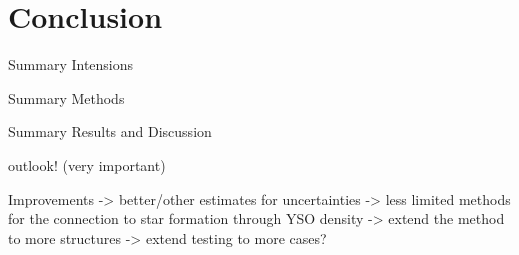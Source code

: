 \chapter{Conclusion}

Summary Intensions

Summary Methods

Summary Results and Discussion

outlook! (very important) 

Improvements
-> better/other estimates for uncertainties
-> less limited methods for the connection to star formation through YSO density
-> extend the method to more structures
-> extend testing to more cases?